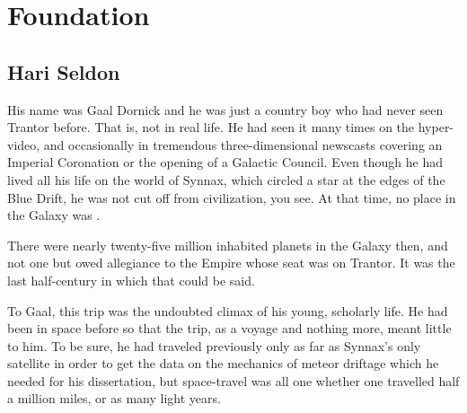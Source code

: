 
\chapter[Foundation][Chapter One]{Foundation}

\newpage

\section{Hari Seldon}

His name was Gaal Dornick and he was just a country boy who had never seen Trantor before. That is, not in real life. He had seen it many times on the hyper-video, and occasionally in tremendous three-dimensional newscasts covering an Imperial Coronation or the opening of a Galactic Council. Even though he had lived all his life on the world of Synnax, which circled a star at the edges of the Blue Drift, he was not cut off from civilization, you see. At that time, no place in the Galaxy was \citep{asimov1951foundation}.

There were nearly twenty-five million inhabited planets in the Galaxy then, and not one but owed allegiance to the Empire whose seat was on Trantor. It was the last half-century in which that could be said.

To Gaal, this trip was the undoubted climax of his young, scholarly life. He had been in space before so that the trip, as a voyage and nothing more, meant little to him. To be sure, he had traveled previously only as far as Synnax's only satellite in order to get the data on the mechanics of meteor driftage which he needed for his dissertation, but space-travel was all one whether one travelled half a million miles, or as many light years. 



